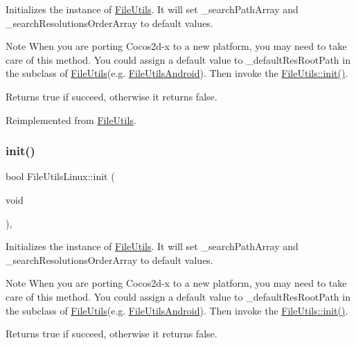 Initializes the instance of \hyperlink{classFileUtils}{File\+Utils}. It will set \+\_\+search\+Path\+Array and \+\_\+search\+Resolutions\+Order\+Array to default values.

\begin{DoxyNote}{Note}
When you are porting Cocos2d-\/x to a new platform, you may need to take care of this method. You could assign a default value to \+\_\+default\+Res\+Root\+Path in the subclass of \hyperlink{classFileUtils}{File\+Utils}(e.\+g. \hyperlink{classFileUtilsAndroid}{File\+Utils\+Android}). Then invoke the \hyperlink{classFileUtils_a2c891e99dc7af7343f4f9e8d4798a563}{File\+Utils\+::init()}. 
\end{DoxyNote}
\begin{DoxyReturn}{Returns}
true if succeed, otherwise it returns false. 
\end{DoxyReturn}


Reimplemented from \hyperlink{classFileUtils_a2c891e99dc7af7343f4f9e8d4798a563}{File\+Utils}.

\mbox{\label{classFileUtilsLinux_a6de155528c1b10597d623f784b72762c}} 
\subsubsection{\texorpdfstring{init()}{init()}\hspace{0.1cm}{\footnotesize\ttfamily [2/2]}}
{\footnotesize\ttfamily bool File\+Utils\+Linux\+::init (\begin{DoxyParamCaption}\item[{void}]{ }\end{DoxyParamCaption})\hspace{0.3cm}{\ttfamily [override]}, {\ttfamily [virtual]}}

Initializes the instance of \hyperlink{classFileUtils}{File\+Utils}. It will set \+\_\+search\+Path\+Array and \+\_\+search\+Resolutions\+Order\+Array to default values.

\begin{DoxyNote}{Note}
When you are porting Cocos2d-\/x to a new platform, you may need to take care of this method. You could assign a default value to \+\_\+default\+Res\+Root\+Path in the subclass of \hyperlink{classFileUtils}{File\+Utils}(e.\+g. \hyperlink{classFileUtilsAndroid}{File\+Utils\+Android}). Then invoke the \hyperlink{classFileUtils_a2c891e99dc7af7343f4f9e8d4798a563}{File\+Utils\+::init()}. 
\end{DoxyNote}
\begin{DoxyReturn}{Returns}
true if succeed, otherwise it returns false. 
\end{DoxyReturn}


